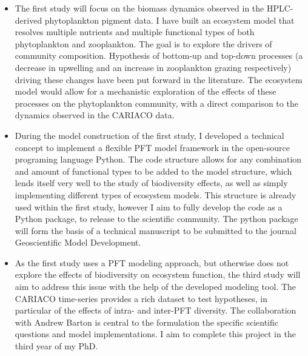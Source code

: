 \begin{itemize}
\item The first study will focus on the biomass dynamics observed in the HPLC-derived phytoplankton pigment data. I have built an ecosystem model that resolves multiple nutrients and multiple functional types of both phytoplankton and zooplankton. The goal is to explore the drivers of community composition. Hypothesis of bottom-up and top-down processes (a decrease in upwelling and an increase in zooplankton grazing respectively) driving these changes have been put forward in the literature. The ecosystem model would allow for a mechanistic exploration of the effects of these processes on the phytoplankton community, with a direct comparison to the dynamics observed in the CARIACO data. %
\item During the model construction of the first study, I developed a technical concept to implement a flexible PFT model framework in the open-source programing language Python. The code structure allows for any combination and amount of functional types to be added to the model structure, which lends itself very well to the study of biodiversity effects, as well as simply implementing different types of ecosystem models. This structure is already used within the first study, however I aim to fully develop the code as a Python package, to release to the scientific community. The python package will form the basis of a technical manuscript to be submitted to the journal Geoscientific Model Development. %
\item As the first study uses a PFT modeling approach, but otherwise does not explore the effects of biodiversity on ecosystem function, the third study will aim to address this issue with the help of the  developed modeling tool. The CARIACO time-series provides a rich dataset to test hypotheses, in particular of the effects of intra- and inter-PFT diversity. The collaboration with Andrew Barton is central to the formulation the specific scientific questions and model implementations. I aim to complete this project in the third year of my PhD. %
\end{itemize}
